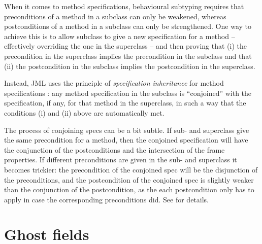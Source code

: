 \documentclass{llncs}
\begin{document}
When it comes to method specifications, behavioural subtyping requires
that preconditions of a method in a subclass can only  be weakened,
whereas postconditions of a method in a subclass can only  be strengthened.
One way to achieve this is to allow subclass to give a new specification
for a method -- effectively overriding the one in the superclass --
and then proving that (i) the precondition in the superclass implies the
precondition in the subclass and that (ii) the postcondition in the subclass
implies the postcondition in the superclass.

Instead, JML uses the principle of \emph{specification inheritance} 
for method specifications \cite{Dhara-Leavens96}: any method specification
in the subclass is ``conjoined'' with the specification, if any, for that
method in the superclass, in such a way that the conditions (i) and (ii) above 
are automatically met.

The process of conjoining specs can be a bit subtle.  If sub- and superclass
give the same precondition for a method, then the conjoined specification will
have the conjunction of the postconditions and the intersection of the frame
properties.  If different preconditions are given in the sub- and superclass it
becomes trickier: the precondition of the conjoined spec will be the
disjunction of the preconditions, and the postcondition of the conjoined spec
is slightly weaker than the conjunction of the postcondition, as the each
postcondition only has to apply in case the corresponding preconditions did.
See \cite{Dhara-Leavens96} for details.


% 



\section{Ghost fields}
\label{Sec:ghost}
\end{document}
